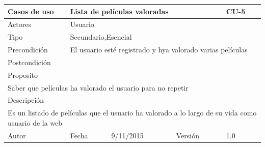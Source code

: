 \documentclass{article}
\begin{document}
\begin{table}[h]
\begin{tabular}{|l|l|l|l|l|l|}
\hline
\multicolumn{2}{|p{2cm}|}{Casos de uso}  & \multicolumn{3}{p{7cm}|}{Lista de películas valoradas} & CU-5 \\
\hline
\multicolumn{2}{|p{2cm}|}{Actores}       & \multicolumn{4}{p{8cm}|}{Usuario}        \\
\hline
\multicolumn{2}{|p{2cm}|}{Tipo}          & \multicolumn{4}{p{8cm}|}{Secundario,Esencial}        \\
\hline
\multicolumn{2}{|p{2cm}|}{Precondición}  & \multicolumn{4}{p{8cm}|}{El usuario esté registrado y hya valorado varias películas}        \\
\hline
\multicolumn{2}{|p{2cm}|}{Postcondición} & \multicolumn{4}{p{8cm}|}{}        \\
\hline
\multicolumn{6}{|p{10cm}|}{Proposito}                                   \\
\hline
\multicolumn{6}{|p{10cm}|}{Saber que películas ha valorado el usuario para no repetir}                                            \\
\hline
\multicolumn{6}{|p{10cm}|}{Descripción}                                 \\
\hline
\multicolumn{6}{|p{10cm}|}{Es un listado de películas que el usuario ha valorado a lo largo de su vida como usuario de la web}                                            \\
\hline
Autor              &              & Fecha    & 9/11/2015     &   Versión  &1.0\\
\hline
\end{tabular}
\end{table}
\end{document}
